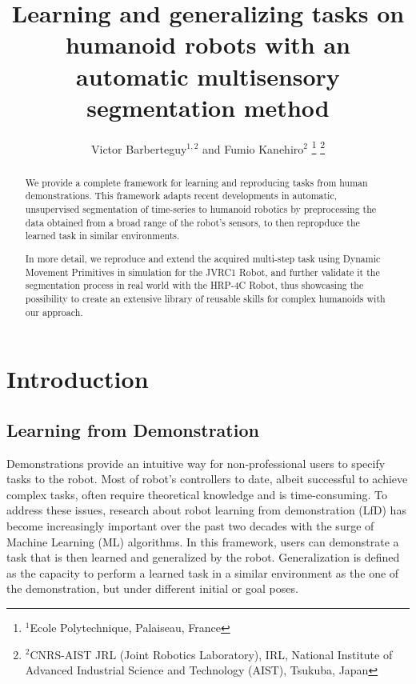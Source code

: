 \documentclass[a4paper, 10pt, conference]{ieeeconf}
\title{\textbf{Learning and generalizing tasks on humanoid robots with an automatic multisensory segmentation method}
}
\author{Victor Barberteguy$^{1,2}$ and Fumio Kanehiro$^{2}$
\thanks{$^{1}$Ecole Polytechnique, Palaiseau, France}
\thanks{$^{2}$CNRS-AIST JRL (Joint Robotics Laboratory), IRL, National Institute of Advanced Industrial Science and Technology (AIST), Tsukuba, Japan}
}
\begin{document}
\maketitle
\thispagestyle{empty}
\pagestyle{empty}

\begin{abstract}
We provide a complete framework for learning and reproducing tasks from human demonstrations. This framework adapts recent developments in automatic, unsupervised segmentation of time-series to humanoid robotics by preprocessing the data obtained from a broad range of the robot's sensors, to then repropduce the learned task in similar environments.

In more detail,  we reproduce and extend the acquired multi-step task using Dynamic Movement Primitives in simulation for the JVRC1 Robot, and further validate it the segmentation process in real world with the HRP-4C Robot, thus showcasing the possibility to create an extensive library of reusable skills for complex humanoids with our approach.
\end{abstract}


\section{Introduction}
\subsection{Learning from Demonstration}

Demonstrations provide an intuitive way for non-professional users to specify tasks to the robot\cite{schaal_is_1999}. Most of robot's controllers to date, albeit successful to achieve complex tasks, often require theoretical knowledge and is time-consuming. To address these issues, research about robot learning from demonstration (LfD) has become increasingly important over the past two decades with the surge of Machine Learning (ML) algorithms\cite{argall_survey_2009,ravichandar_recent_2020}. In this framework, users can demonstrate a task that is then learned and generalized by the robot. Generalization is defined as the capacity to perform a learned task in a similar environment as the one of the demonstration, but under different initial or goal poses. 
\end{document}
